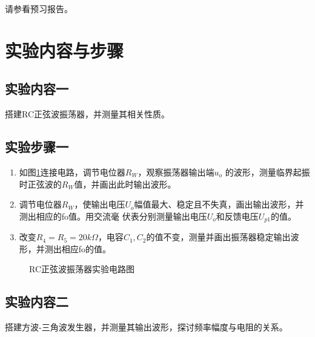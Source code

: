\documentclass[a4paper,11pt,UTF8]{ctexart}
\begin{document}
请参看预习报告。

\section{实验内容与步骤}
\subsection{实验内容一}
	搭建RC正弦波振荡器，并测量其相关性质。
\subsection{实验步骤一}
\begin{enumerate}
  \item 如图\ref{fig:RCSin}连接电路，调节电位器$R_W$，观察振荡器输出端$u_o$
  的波形，测量临界起振时正弦波的$R_W$值，并画出此时输出波形。
  \item 调节电位器$R_W$，使输出电压$U_o$幅值最大、稳定且不失真，画出输出波形，并测出相应的fo值。用交流毫
  伏表分别测量输出电压$U_o$和反馈电压$U_{p1}$的值。
  \item 改变$R_4=R_5=20kΩ$，电容$C_1,C_2$的值不变，测量并画出振荡器稳定输出波形，并测出相应fo的值。
\end{enumerate}
\begin{figure}[htbp]
  \centering
  \caption{RC正弦波振荡器实验电路图}
  \label{fig:RCSin}
  \end{figure}
\subsection{实验内容二}
	搭建方波-三角波发生器，并测量其输出波形，探讨频率幅度与电阻的关系。
\end{document}
